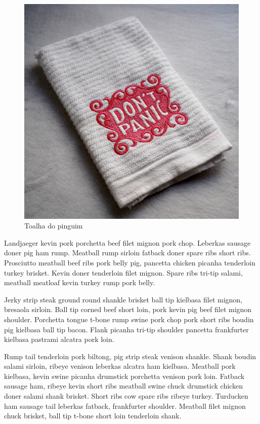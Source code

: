 \documentclass[a4paper,11pt]{article}
\begin{document}
\begin{figure}[p]
   \begin{center}
      \includegraphics[scale=0.2]{toalha.jpg}
      \caption{Toalha do pinguim}
      \label{Toalha}
   \end{center}
\end{figure}
Landjaeger kevin pork porchetta beef filet mignon pork chop. Leberkas sausage doner pig ham rump. Meatball rump sirloin fatback doner spare ribs short ribs. Prosciutto meatball beef ribs pork belly pig, pancetta chicken picanha tenderloin turkey brisket. Kevin doner tenderloin filet mignon. Spare ribs tri-tip salami, meatball meatloaf kevin turkey rump pork belly.

Jerky strip steak ground round shankle brisket ball tip kielbasa filet mignon, bresaola sirloin. Ball tip corned beef short loin, pork kevin pig beef filet mignon shoulder. Porchetta tongue t-bone rump swine pork chop pork short ribs boudin pig kielbasa ball tip bacon. Flank picanha tri-tip shoulder pancetta frankfurter kielbasa pastrami alcatra pork loin.

Rump tail tenderloin pork biltong, pig strip steak venison shankle. Shank boudin salami sirloin, ribeye venison leberkas alcatra ham kielbasa. Meatball pork kielbasa, kevin swine picanha drumstick porchetta venison pork loin. Fatback sausage ham, ribeye kevin short ribs meatball swine chuck drumstick chicken doner salami shank brisket. Short ribs cow spare ribs ribeye turkey. Turducken ham sausage tail leberkas fatback, frankfurter shoulder. Meatball filet mignon chuck brisket, ball tip t-bone short loin tenderloin shank.
\end{document}
